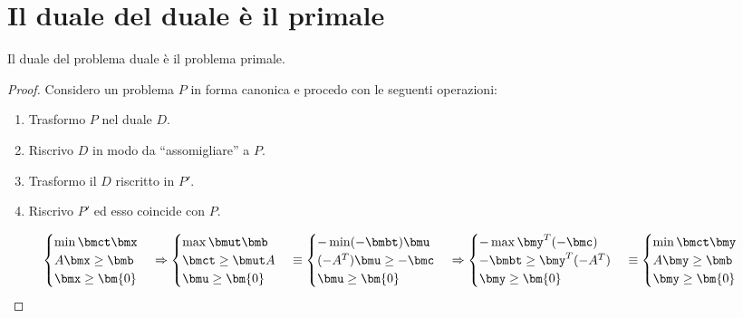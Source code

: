 \documentclass[\main/main.tex]{subfiles}
\begin{document}
\section{Il duale del duale è il primale}

\begin{theorem}
  Il duale del problema duale è il problema primale.
\end{theorem}

\begin{proof}
  Considero un problema $P$ in forma canonica e procedo con le seguenti operazioni:

  \begin{enumerate}
    \item Trasformo $P$ nel duale $D$.
    \item Riscrivo $D$ in modo da ``assomigliare'' a $P$.
    \item Trasformo il $D$ riscritto in $P'$.
    \item Riscrivo $P'$ ed esso coincide con $P$.
  \end{enumerate}

  \[
    \begin{cases}
      \min \bmct \bmx \\
      A\bmx \geq \bmb \\
      \bmx \geq \bm{0}
    \end{cases}
    \Rightarrow
    \begin{cases}
      \max \bmut\bmb     \\
      \bmct \geq \bmut A \\
      \bmu \geq \bm{0}
    \end{cases}
    \equiv
    \begin{cases}
      - \min (-\bmbt)\bmu   \\
      (-A^T)\bmu \geq -\bmc \\
      \bmu \geq \bm{0}
    \end{cases}
    \Rightarrow
    \begin{cases}
      - \max \bmy^T(-\bmc)     \\
      -\bmbt \geq \bmy^T(-A^T) \\
      \bmy \geq \bm{0}
    \end{cases}
    \equiv
    \begin{cases}
      \min \bmct \bmy \\
      A\bmy\geq \bmb  \\
      \bmy \geq \bm{0}
    \end{cases}
  \]

\end{proof}
\end{document}
